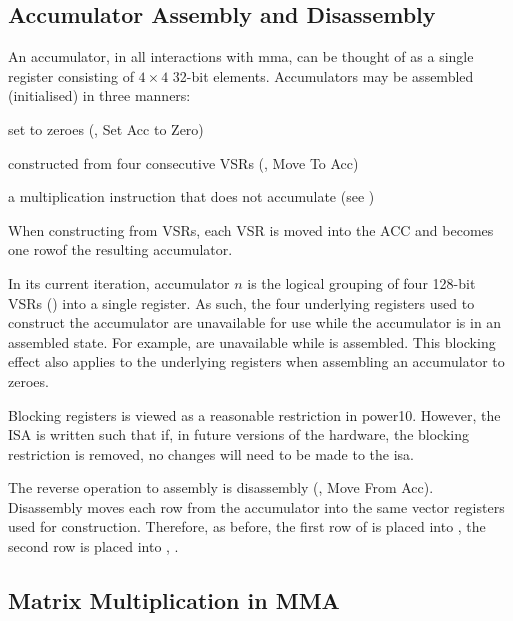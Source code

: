 \documentclass[\main/thesis.tex]{subfiles}
\begin{document}
\subsection{Accumulator Assembly and Disassembly}
An accumulator, in all interactions with \gls{mma}, can be thought of as a single register consisting of $4 \times 4$ 32-bit elements.
Accumulators may be assembled (initialised) in three manners:
\begin{enumerate*}[itemjoin*={{ and }}, label=\textbf{(\arabic*)}, after={.}]
  \item set to zeroes (, Set Acc to Zero)
  \item constructed from four consecutive VSRs (, Move To Acc)
  \item a multiplication instruction that does not accumulate (see )
\end{enumerate*}
When constructing from VSRs, each VSR is moved into the ACC and becomes one row\footnotemark of the resulting accumulator.

In its current iteration, accumulator $n$ is the logical grouping of four 128-bit VSRs () into a single register.
As such, the four underlying registers used to construct the accumulator are unavailable for use while the accumulator is in an assembled state.
For example,  are unavailable while  is assembled.
This blocking effect also applies to the underlying registers when assembling an accumulator to zeroes.

Blocking registers is viewed as a reasonable restriction in \gls{power10}.
However, the ISA is written such that if, in future versions of the hardware, the blocking restriction is removed, no changes will need to be made to the \gls{isa}.

The reverse operation to assembly is disassembly (, Move From Acc).
Disassembly moves each row from the accumulator into the same vector registers used for construction.
Therefore, as before, the first row of  is placed into , the second row is placed into , \etc.

\subsection{Matrix Multiplication in MMA}
\label{sec:matMulMMA}
\end{document}
